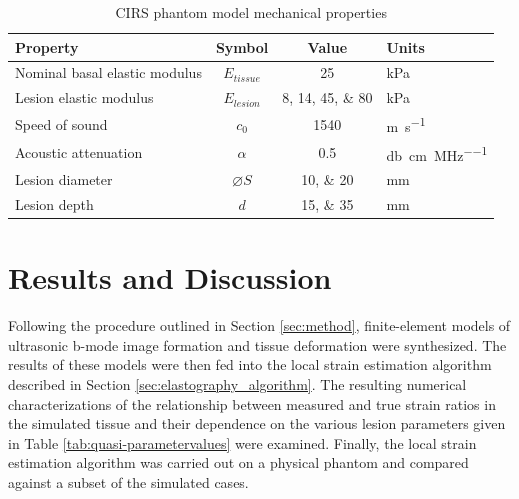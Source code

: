 			\begin{table}[!htb]
				\centering
				\caption{CIRS phantom model mechanical properties}
				\label{tab:phantomproperties}
				\begin{tabular}{lccs[table-unit-alignment = left]}
					\toprule
					Property & Symbol & Value & Units \\
					\midrule
					Nominal basal elastic modulus & $E_{tissue}$ & 25 & \si{\kPa} \\
					Lesion elastic modulus & $E_{lesion}$ & \numlist{8;14;45;80} & \si{\kPa} \\
					Speed of sound & $c_0$ & 1540 & \si{\metre\per\second} \\
					Acoustic attenuation & $\alpha$ & 0.5 & \si{\decibel\per\cm\per\MHz} \\
					Lesion diameter & $\diameter S$ & \numlist{10;20} & \si{\mm} \\
					Lesion depth & $d$ & \numlist{15;35} & \si{\mm} \\
					\bottomrule
				\end{tabular}
			\end{table}

	\section{Results and Discussion}
		Following the procedure outlined in Section \ref{sec:method}, finite-element models of ultrasonic b-mode image formation and tissue deformation were synthesized. The results of these models were then fed into the local strain estimation algorithm described in Section \ref{sec:elastography_algorithm}. The resulting numerical characterizations of the relationship between measured and true strain ratios in the simulated tissue and their dependence on the various lesion parameters given in Table \ref{tab:quasi-parametervalues} were examined. Finally, the local strain estimation algorithm was carried out on a physical phantom and compared against a subset of the simulated cases.

